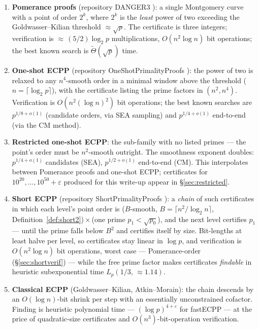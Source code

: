 \documentclass[11pt]{amsart}
\newcommand{\Tt}{\widetilde{\Theta}}
\newcommand{\eps}{\varepsilon}
\newcommand{\Lp}[2]{L_{p}\!\left(#1,\,#2\right)}
\theoremstyle{plain}
\theoremstyle{definition}
\theoremstyle{remark}
\begin{document}
\begin{enumerate}
\item \textbf{Pomerance proofs} (repository DANGER3 \cite{DANGER3}): a single Montgomery curve with a
point of order $2^k$, where $2^k$ is the \emph{least} power of two exceeding the Goldwasser--Kilian
threshold ${\approx}\sqrt p$.  The certificate is three integers; verification is
${\approx}\,(5/2)\log_2 p$ multiplications, $O(n^2\log n)$ bit operations; the best known search is
$\Tt(\sqrt p)$ time.
\item \textbf{One-shot ECPP} (repository OneShotPrimalityProofs \cite{OneShot}): the power of two is
relaxed to any $n^4$-smooth order in a minimal window above the threshold
($n = \lceil\log_2 p\rceil$), with the certificate listing the prime factors in $(n^2, n^4)$.
Verification is $O(n^2(\log n)^2)$ bit operations; the best known searches are $p^{1/8+o(1)}$
(candidate orders, via SEA sampling) and $p^{1/4+o(1)}$ end-to-end (via the CM method).
\item \textbf{Restricted one-shot ECPP}: the sub-family with no listed primes --- the point's order must
be $n^2$-smooth outright.  The smoothness exponent doubles: $p^{1/4+o(1)}$ candidates (SEA),
$p^{1/2+o(1)}$ end-to-end (CM).  This interpolates between Pomerance proofs and one-shot ECPP;
certificates for $10^{20},\dots,10^{50}+\eps$ produced for this write-up appear in
\S\ref{sec:restricted}.
\item \textbf{Short ECPP} (repository ShortPrimalityProofs \cite{Short}): a \emph{chain} of such
certificates in which each level's point order is ($B$-smooth, $B = \lceil n^2/\log_2 n\rceil$,
Definition~\ref{def:short2})${}\times{}$(one prime $p_1 < \sqrt{p_0}$), and the next level
certifies $p_1$ --- until the prime falls below $B^2$ and certifies itself by size.  Bit-lengths at least halve per level, so
certificates stay linear in $\log p$, and verification is $O(n^2\log n)$ bit operations, worst
case --- Pomerance-order (\S\ref{sec:shortverif}) --- while the free prime factor makes certificates
\emph{findable} in heuristic subexponential time $\Lp{1/3}{{\approx}1.14}$.
\item \textbf{Classical ECPP} (Goldwasser--Kilian, Atkin--Morain): the chain descends by an
$O(\log n)$-bit shrink per step with an essentially unconstrained cofactor.  Finding is heuristic
polynomial time --- $(\log p)^{4+\eps}$ for fastECPP --- at the price of quadratic-size certificates and
$O(n^3)$-bit-operation verification.
\end{enumerate}
\end{document}
